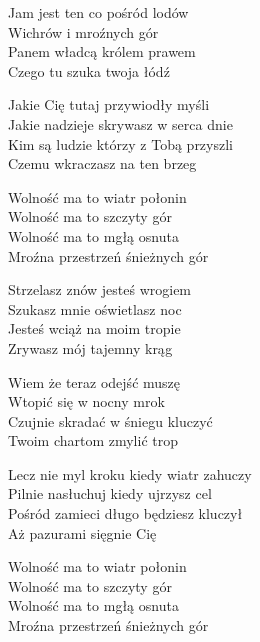 \begin{text}
    Jam jest ten co pośród lodów\\
    Wichrów i mroźnych gór\\
    Panem władcą królem prawem\\
    Czego tu szuka twoja łódź

    \vin Jakie Cię tutaj przywiodły myśli\\
    \vin Jakie nadzieje skrywasz w serca dnie\\
    \vin Kim są ludzie którzy z Tobą przyszli\\
    \vin Czemu wkraczasz na ten brzeg

    \vin Wolność ma to wiatr połonin\\
    \vin Wolność ma to szczyty gór\\
    \vin Wolność ma to mgłą osnuta\\
    \vin Mroźna przestrzeń śnieżnych gór

    Strzelasz znów jesteś wrogiem\\
    Szukasz mnie oświetlasz noc\\
    Jesteś wciąż na moim tropie\\
    Zrywasz mój tajemny krąg

    Wiem że teraz odejść muszę\\
    Wtopić się w nocny mrok\\
    Czujnie skradać w śniegu kluczyć\\
    Twoim chartom zmylić trop

    \vin Lecz nie myl kroku kiedy wiatr zahuczy\\
    \vin Pilnie nasłuchuj kiedy ujrzysz cel\\
    \vin Pośród zamieci długo będziesz kluczył\\
    \vin Aż pazurami sięgnie Cię

    \vin Wolność ma to wiatr połonin\\
    \vin Wolność ma to szczyty gór\\
    \vin Wolność ma to mgłą osnuta\\
    \vin Mroźna przestrzeń śnieżnych gór
\end{text}
\begin{chord}

\end{chord}
